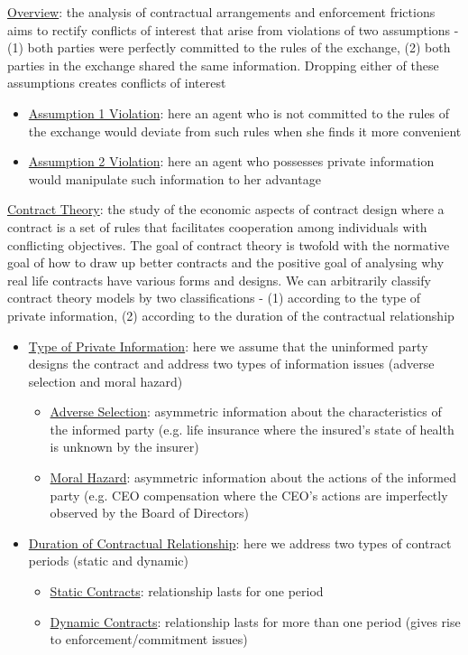 \documentclass{article}
\begin{document}
\vspace{2.5mm}
\par \underline{Overview}: the analysis of contractual arrangements and enforcement frictions aims to rectify conflicts of interest that arise from violations of two assumptions - (1) both parties were perfectly committed to the rules of the exchange, (2) both parties in the exchange shared the same information. Dropping either of these assumptions creates conflicts of interest
\begin{itemize}
    \item  \underline{Assumption 1 Violation}: here an agent who is not committed to the rules of the exchange would deviate from such rules when she finds it more convenient
    \item  \underline{Assumption 2 Violation}: here an agent who possesses private information would manipulate such information to her advantage
\end{itemize}
\vspace{2.5mm}
\par \underline{Contract Theory}: the study of the economic aspects of contract design where a contract is a set of rules that facilitates cooperation among individuals with conflicting objectives. The goal of contract theory is twofold with the normative goal of how to draw up better contracts and the positive goal of analysing why real life contracts have various forms and designs. We can arbitrarily classify contract theory models by two classifications - (1) according to the type of private information, (2) according to the duration of the contractual relationship
\begin{itemize}
    \item \underline{Type of Private Information}: here we assume that the uninformed party designs the contract and address two types of information issues (adverse selection and moral hazard)
    \begin{itemize}
        \item  \underline{Adverse Selection}: asymmetric information about the characteristics of the informed party (e.g. life insurance where the insured's state of health is unknown by the insurer)
        \item  \underline{Moral Hazard}: asymmetric information about the actions of the informed party (e.g. CEO compensation where the CEO's actions are imperfectly observed by the Board of Directors)
    \end{itemize}
    \item  \underline{Duration of Contractual Relationship}: here we address two types of contract periods (static and dynamic)
    \begin{itemize}
        \item  \underline{Static Contracts}: relationship lasts for one period
        \item  \underline{Dynamic Contracts}: relationship lasts for more than one period (gives rise to enforcement/commitment issues)
    \end{itemize}
\end{itemize}
\end{document}
